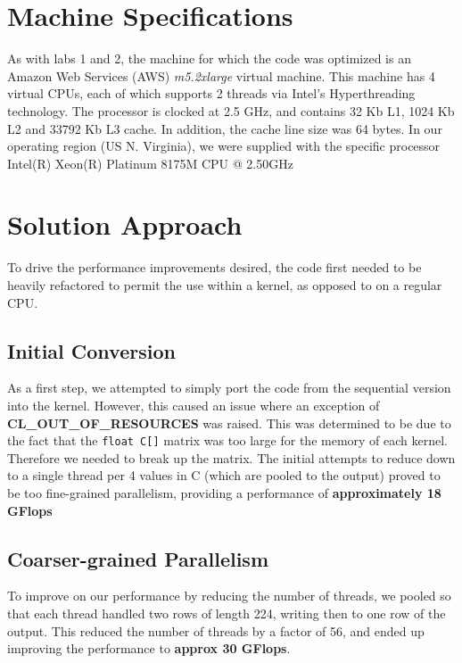 \documentclass[letterpaper,twocolumn,10pt]{article}
\def\code#1{\texttt{#1}}
\begin{document}
\section{Machine Specifications}

As with labs 1 and 2, the machine for which the code was optimized is an Amazon
Web  Services (AWS) \textit{m5.2xlarge} virtual machine. This machine has 4
virtual  CPUs, each of which supports 2 threads via Intel's Hyperthreading
technology. The processor is clocked at 2.5 GHz, and contains 32 Kb L1, 1024 Kb 
L2 and 33792 Kb L3 cache. In addition, the cache line size was 64 bytes. In our
operating region (US N. Virginia), we were supplied with the specific processor
Intel(R) Xeon(R) Platinum 8175M CPU @ 2.50GHz

\section{Solution Approach}
To drive the performance improvements desired, the code first needed to be
heavily refactored to permit the use within a kernel, as opposed to on a regular
CPU.

\subsection{Initial Conversion}
As a first step, we attempted to simply port the code from the sequential
version into the kernel. However, this caused an issue where an exception of
\textbf{CL\_OUT\_OF\_RESOURCES} was raised. This was determined to be due to
the fact that the \code{float C[]} matrix was too large for the memory of each
kernel. Therefore we needed to break up the matrix. The initial attempts to
reduce down to a single thread per 4 values in C (which are pooled to the
output) proved to be too fine-grained parallelism, providing a performance of
\textbf{approximately 18 GFlops}

\subsection{Coarser-grained Parallelism}
To improve on our performance by reducing the number of threads, we pooled so
that each thread handled two rows of length 224, writing then to one row of
the output. This reduced the number of threads by a factor of 56, and ended up
improving the performance to \textbf{approx 30 GFlops}.
\end{document}

